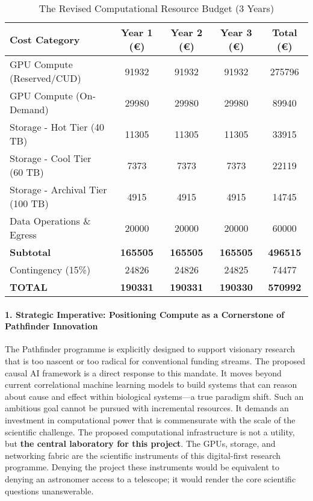 \begin{table}[H]
\centering
\caption{The Revised Computational Resource Budget (3 Years)}
\label{tab:computational_budget}
\begin{tabular}{lS[table-format=6.0]S[table-format=6.0]S[table-format=6.0]S[table-format=6.0]}
\toprule
\textbf{Cost Category} & {\textbf{Year 1 (€)}} & {\textbf{Year 2 (€)}} & {\textbf{Year 3 (€)}} & {\textbf{Total (€)}} \\
\midrule
GPU Compute (Reserved/CUD) & 91932 & 91932 & 91932 & 275796 \\
GPU Compute (On-Demand) & 29980 & 29980 & 29980 & 89940 \\
Storage - Hot Tier (40 TB) & 11305 & 11305 & 11305 & 33915 \\
Storage - Cool Tier (60 TB) & 7373 & 7373 & 7373 & 22119 \\
Storage - Archival Tier (100 TB) & 4915 & 4915 & 4915 & 14745 \\
Data Operations \& Egress & 20000 & 20000 & 20000 & 60000 \\
\midrule
\textbf{Subtotal} & \textbf{165505} & \textbf{165505} & \textbf{165505} & \textbf{496515} \\
\midrule
Contingency (15\%) & 24826 & 24826 & 24825 & 74477 \\
\midrule
\textbf{TOTAL} & \textbf{190331} & \textbf{190331} & \textbf{190330} & \textbf{570992} \\
\bottomrule
\end{tabular}
\end{table}

\paragraph{1. Strategic Imperative: Positioning Compute as a Cornerstone of Pathfinder Innovation}
The Pathfinder programme is explicitly designed to support visionary research that is too nascent or too radical for conventional funding streams. The proposed causal AI framework is a direct response to this mandate. It moves beyond current correlational machine learning models to build systems that can reason about cause and effect within biological systems—a true paradigm shift. Such an ambitious goal cannot be pursued with incremental resources. It demands an investment in computational power that is commensurate with the scale of the scientific challenge. The proposed computational infrastructure is not a utility, but \textbf{the central laboratory for this project}. The GPUs, storage, and networking fabric are the scientific instruments of this digital-first research programme. Denying the project these instruments would be equivalent to denying an astronomer access to a telescope; it would render the core scientific questions unanswerable.

